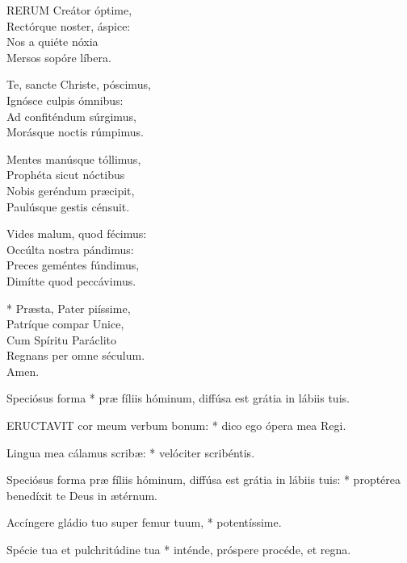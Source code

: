 
\lettrine[lines=2]{R}{ERUM} Creátor óptime,\\
Rectórque noster, áspice:\\
Nos a quiéte nóxia\\
Mersos sopóre líbera.

Te, sancte Christe, póscimus,\\
Ignósce culpis ómnibus:\\
Ad confiténdum súrgimus,\\
Morásque noctis rúmpimus.

Mentes manúsque tóllimus,\\
Prophéta sicut nóctibus\\
Nobis geréndum præcipit,\\
Paulúsque gestis cénsuit.

Vides malum, quod fécimus:\\
Occúlta nostra pándimus:\\
Preces geméntes fúndimus,\\
Dimítte quod peccávimus.

* Præsta, Pater piíssime,\\
Patríque compar Unice,\\
Cum Spíritu Paráclito\\
Regnans per omne séculum.\\
Amen.



 Speciósus forma * præ fíliis hóminum, diffúsa est grátia in lábiis tuis.


\lettrine[lines=2]{E}{RUCTAVIT} cor meum verbum bonum: * dico ego ópera mea Regi.

Lingua mea cálamus scribæ: * velóciter scribéntis.

Speciósus forma præ fíliis hóminum, diffúsa est grátia in lábiis tuis: * proptérea benedíxit te Deus in ætérnum.

Accíngere gládio tuo super femur tuum, * potentíssime.

Spécie tua et pulchritúdine tua * inténde, próspere procéde, et regna.

